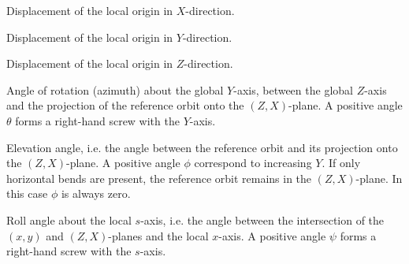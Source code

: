 \begin{mylist}
Displacement of the local origin in \(X\)-direction.
 
Displacement of the local origin in \(Y\)-direction.
 
Displacement of the local origin in \(Z\)-direction.
 
\ttitem[THETA]
Angle of rotation (azimuth) about the global \(Y\)-axis,
between the global \(Z\)-axis and the projection
of the reference orbit onto the \((Z, X)\)-plane.
A positive angle \(\theta\) forms a right-hand screw with the
\(Y\)-axis.
 
\ttitem[PHI]
Elevation angle,
i.e. the angle between the reference orbit and its projection
onto the \((Z, X)\)-plane.
A positive angle \(\phi\) correspond to increasing \(Y\).
If only horizontal bends are present,
the reference orbit remains in the \((Z, X)\)-plane.
In this case \(\phi\) is always zero.
 
\ttitem[PSI]
Roll angle about the local \(s\)-axis,
i.e. the angle between the intersection
of the \((x, y)\) and \((Z, X)\)-planes and the local \(x\)-axis.
A positive angle \(\psi\) forms a right-hand screw with the \(s\)-axis.
\end{mylist}
 
